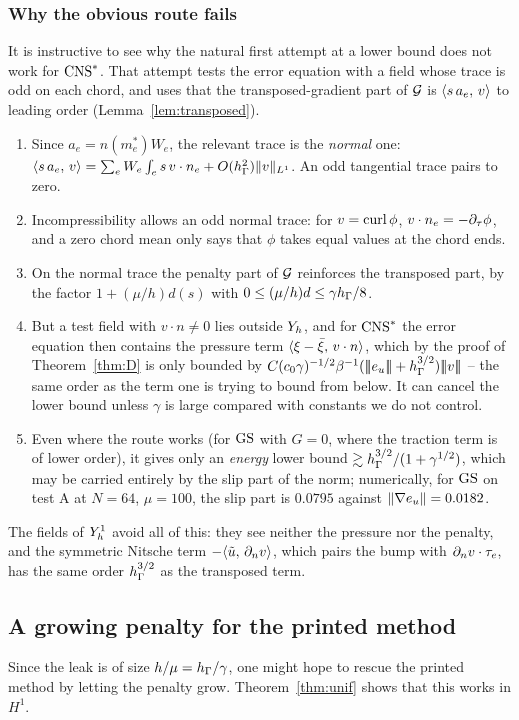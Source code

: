 \subsubsection*{Why the obvious route fails}
It is instructive to see why the natural first attempt at a lower bound does not work for $\mathrm{CNS}^\ast$. That attempt tests the error equation with a field whose trace is odd on each chord, and uses that the transposed-gradient part of $\mathcal G$ is $\langle s\,a_e,\, v\rangle$ to leading order (Lemma~\ref{lem:transposed}).
\begin{enumerate}
\item Since $a_e=n(m_e^\ast)W_e$, the relevant trace is the \emph{normal} one: $\langle s\,a_e,\, v\rangle=\sum_eW_e\int_es\,v\cdot n_e+O(h_\Gamma^2)\lVert v\rVert_{L^1}$. An odd tangential trace pairs to zero.
\item Incompressibility allows an odd normal trace: for $v=\operatorname{curl}\phi$, $v\cdot n_e=-\partial_\tau\phi$, and a zero chord mean only says that $\phi$ takes equal values at the chord ends.
\item On the normal trace the penalty part of $\mathcal G$ reinforces the transposed part, by the factor $1+(\mu/h)d(s)$ with $0\le(\mu/h)d\le\gamma h_\Gamma/8$.
\item But a test field with $v\cdot n\ne0$ lies outside $Y_h$, and for $\mathrm{CNS}^\ast$ the error equation then contains the pressure term $\langle \xi-\bar\xi,\, v\cdot n\rangle$, which by the proof of Theorem~\ref{thm:D} is only bounded by $C(c_0\gamma)^{-1/2}\beta^{-1}(\tnorm{e_u}+\hG^{3/2})\tnorm v$ -- the same order as the term one is trying to bound from below. It can cancel the lower bound unless $\gamma$ is large compared with constants we do not control.
\item Even where the route works (for $\mathrm{GS}$ with $G=0$, where the traction term is of lower order), it gives only an \emph{energy} lower bound $\gtrsim h_\Gamma^{3/2}/(1+\gamma^{1/2})$, which may be carried entirely by the slip part of the norm; numerically, for $\mathrm{GS}$ on test A at $N=64$, $\mu=100$, the slip part is $0.0795$ against $\lVert \nabla e_u\rVert=0.0182$.
\end{enumerate}
The fields of $Y_h^1$ avoid all of this: they see neither the pressure nor the penalty, and the symmetric Nitsche term $-\langle \tilde u,\, \partial_n v\rangle$, which pairs the bump with $\partial_n v\cdot\tau_e$, has the same order $h_\Gamma^{3/2}$ as the transposed term.

\subsection{A growing penalty for the printed method}\label{sec:growing}
Since the leak is of size $h/\mu=h_\Gamma/\gamma$, one might hope to rescue the printed method by letting the penalty grow. Theorem~\ref{thm:unif} shows that this works in $H^1$.

